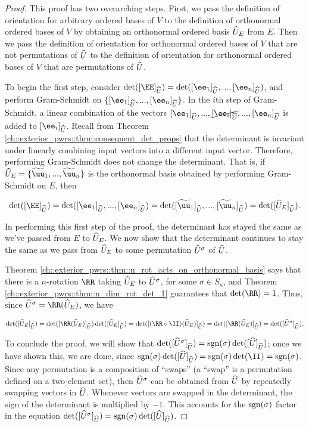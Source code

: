 \begin{proof}
   This proof has two overarching steps. First, we pass the definition of orientation for arbitrary ordered bases of $V$ to the definition of orthonormal ordered bases of $V$ by obtaining an orthonormal ordered basis $\widehat{U}_E$ from $E$. Then we pass the definition of orientation for orthonormal ordered bases of $V$ that are not permutations of $\widehat{U}$ to the definition of orientation for orthonormal ordered bases of $V$ that are permutations of $\widehat{U}$.
   
   To begin the first step, consider $\det([\EE]_{\hU}) = \det([\ee_1]_{\hU}, ..., [\ee_n]_{\hU})$, and perform Gram-Schmidt on $\{[\ee_1]_{\hU}, ..., [\ee_n]_{\hU}\}$. In the $i$th step of Gram-Schmidt, a linear combination of the vectors $[\ee_1]_{\hU}, ..., \cancel{[\ee_i]_{\hU}}, ..., [\ee_n]_{\hU}$ is added to $[\ee_i]_{\hU}$. Recall from Theorem \ref{ch::exterior_pwrs::thm::consequent_det_props} that the determinant is invariant under linearly combining input vectors into a different input vector. Therefore, performing Gram-Schmidt does not change the determinant. That is, if $\hU_E = \{\tuu_1, ..., \tuu_n\}$ is the orthonormal basis obtained by performing Gram-Schmidt on $E$, then 
   
   \begin{align*}
       \det([\EE]_{\hU}) = \det([\ee_1]_{\hU}, ..., [\ee_n]_{\hU}) = \det([\tuu_1]_{\hU}, ..., [\tuu_n]_{\hU})
       =
       \det([\hU_E]_{\hU}).
   \end{align*}
   
   In performing this first step of the proof, the determinant has stayed the same as we've passed from $E$ to $\widehat{U}_E$. We now show that the determinant continues to stay the same as we pass from  $\widehat{U}_E$ to some permutation $\widehat{U}^\sigma$ of $\widehat{U}$.
   
   Theorem \ref{ch::exterior_pwrs::thm::n_rot_acts_on_orthonormal_basis} says that there is a $n$-rotation $\RR$ taking $\widehat{U}_E$ to $\widehat{U}^\sigma$, for some $\sigma \in S_n$, and Theorem \ref{ch::exterior_pwrs::thm::n_dim_rot_det_1} guarantees that $\det(\RR) = 1$. Thus, since $\hU^\sigma = \RR(\hU_E)$, we have
   
   \begin{align*}
        \det([\hU_E]_{\hU}) 
        = \det([\RR(\hU_E)]_{\hU}) \det([\hU_E]_{\hU})
        = \det([(\RR \circ \II)(\hU_E)]_{\hU})
        = \det([\RR(\hU_E)]_{\hU})
        = \det([\hU^\sigma]_{\hU}).
   \end{align*}
   
   To conclude the proof, we will show that $\det([\widehat{U}^\sigma]_{\widehat{U}}) = \text{sgn}(\sigma) \det([\widehat{U}]_{\widehat{U}})$; once we have shown this, we are done, since $\sgn(\sigma) \det([\hU]_{\hU}) = \sgn(\sigma) \det(\II) = \sgn(\sigma)$. Since any permutation is a composition of ``swaps'' (a ``swap'' is a permutation defined on a two-element set), then $\widehat{U}^\sigma$ can be obtained from $\widehat{U}$ by repeatedly swapping vectors in $\widehat{U}$. Whenever vectors are swapped in the determinant, the sign of the determinant is multiplied by $-1$. This accounts for the $\text{sgn}(\sigma)$ factor in the equation $\det([\widehat{U}^\sigma]_{\widehat{U}}) = \text{sgn}(\sigma) \det([\widehat{U}]_{\widehat{U}})$.
\end{proof}

